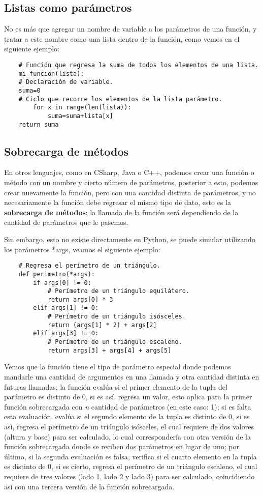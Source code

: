 \subsection{Listas como parámetros}

No es más que agregar un nombre de variable a los parámetros de una función, y tratar a este nombre como una lista dentro de la función, como vemos en el siguiente ejemplo:
\begin{lstlisting}
    # Función que regresa la suma de todos los elementos de una lista.
    mi_funcion(lista):
	# Declaración de variable.
	suma=0
	# Ciclo que recorre los elementos de la lista parámetro.
        for x in range(len(lista)):
            suma=suma+lista[x]
   	return suma
\end{lstlisting}


\subsection{Sobrecarga de métodos}

En otros lenguajes, como en CSharp, Java o C++, podemos crear una función o método con un nombre y cierto número de parámetros, posterior a esto, podemos crear nuevamente la función, pero con una cantidad distinta de parámetros, y no necesariamente la función debe regresar el mismo tipo de dato, esto es la \textbf{sobrecarga de métodos}; la llamada de la función será dependiendo de la cantidad de parámetros que le pasemos.

Sin embargo, esto no existe directamente en Python, se puede simular utilizando los parámetros *args, veamos el siguiente ejemplo:
\begin{lstlisting}
    # Regresa el perímetro de un triángulo.
    def perimetro(*args):
        if args[0] != 0:
            # Perímetro de un triángulo equilátero.
            return args[0] * 3
        elif args[1] != 0:
            # Perímetro de un triángulo isósceles.
            return (args[1] * 2) + args[2]
        elif args[3] != 0:
            # Perímetro de un triángulo escaleno.
            return args[3] + args[4] + args[5]
\end{lstlisting}

Vemos que la función tiene el tipo de parámetro especial donde podemos mandarle una cantidad de argumentos en una llamada y otra cantidad distinta en futuras llamadas; la función evalúa si el primer elemento de la tupla del parámetro es distinto de 0, si es así, regresa un valor, esto aplica para la primer función sobrecargada con \textit{n} cantidad de parámetros (en este caso: 1); si es falta esta evaluación, evalúa si el segundo elemento de la tupla es distinto de 0, si es así, regresa el perímetro de un triángulo isósceles, el cual requiere de dos valores (altura y base) para ser calculado, lo cual correspondería con otra versión de la función sobrecargada donde se reciben dos parámetros en lugar de uno; por último, si la segunda evaluación es falsa, verifica si el cuarto elemento en la tupla es distinto de 0, si es cierto, regresa el perímetro de un triángulo escaleno, el cual requiere de tres valores (lado 1, lado 2 y lado 3) para ser calculado, coincidiendo así con una tercera versión de la función sobrecargada.

